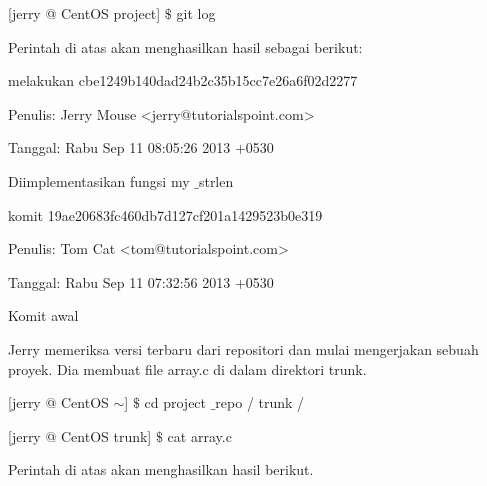 \vspace{\baselineskip}
\noindent 
 \hspace*{0.5in} [jerry @ CentOS project]  $  \$  $ git log \par
 \vspace{\baselineskip}
\noindent 
Perintah di atas akan menghasilkan hasil sebagai berikut: \par
\noindent 
 \hspace*{0.5in} melakukan cbe1249b140dad24b2c35b15cc7e26a6f02d2277 \par
\noindent 
 \hspace*{0.5in} Penulis: Jerry Mouse <jerry@tutorialspoint.com> \par
\noindent 
 \hspace*{0.5in} Tanggal: Rabu Sep 11 08:05:26 2013 +0530 \par
\noindent 
 \hspace*{0.5in} Diimplementasikan fungsi my $  \_  $strlen \par
 \vspace{\baselineskip}
\noindent 
 \hspace*{0.5in}  \hspace*{0.5in} komit 19ae20683fc460db7d127cf201a1429523b0e319 \par
\noindent 
 \hspace*{0.5in}  \hspace*{0.5in} Penulis: Tom Cat <tom@tutorialspoint.com> \par
\noindent 
 \hspace*{0.5in}  \hspace*{0.5in} Tanggal: Rabu Sep 11 07:32:56 2013 +0530 \par
 \vspace{\baselineskip}
\noindent 
Komit awal \par
\noindent 
 \hspace*{0.5in} Jerry memeriksa versi terbaru dari repositori dan mulai mengerjakan sebuah proyek. Dia membuat file array.c di dalam direktori trunk. \par
 \vspace{\baselineskip}
 \vspace{\baselineskip}
\noindent 
 \hspace*{0.5in} [jerry @ CentOS  $  \sim  $]  $  \$  $ cd project $  \_  $repo / trunk / \par
\noindent 
 \hspace*{0.5in} [jerry @ CentOS trunk]  $  \$  $ cat array.c \par
\noindent 
 \hspace*{0.5in} Perintah di atas akan menghasilkan hasil berikut. \par

